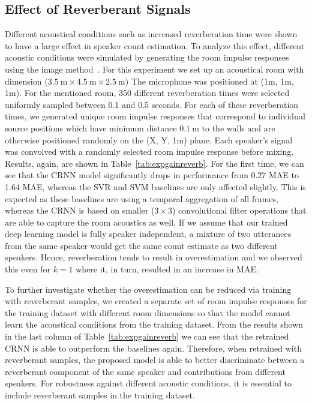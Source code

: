 \subsection{Effect of Reverberant Signals}%
\label{ssec:exp_reverb}
Different acoustical conditions such as increased reverberation time were shown~\cite{Pasha17_reverb} to have a large effect in speaker count estimation.
To analyze this effect, different acoustic conditions were simulated by generating the room impulse responses using the image method~\cite{allen79, habets16}.
For this experiment we set up an acoustical room with dimension ($3.5~\mbox{m} \times 4.5~\mbox{m} \times 2.5~\mbox{m}$)
The microphone was positioned at (1m, 1m, 1m).
For the mentioned room, 350 different reverberation times were selected uniformly sampled between 0.1 and 0.5 seconds.
For each of these reverberation times, we generated unique room impulse responses that correspond to individual source positions which have minimum distance $0.1~\mbox{m}$ to the walls and are otherwise positioned randomly on the (X, Y, 1m) plane.
Each speaker's signal was convolved with a randomly selected room impulse response before mixing.
Results, again, are shown in Table~\ref{tab:expgainreverb}.
For the first time, we can see that the CRNN model significantly drops in performance from 0.27 MAE to 1.64 MAE, whereas the SVR and SVM baselines are only affected slightly.
This is expected as these baselines are using a temporal aggregation of all frames, whereas the CRNN is based on smaller (\(3 \times 3\)) convolutional filter operations that are able to capture the room acoustics as well.
If we assume that our trained deep learning model is fully speaker independent, a mixture of two utterances from the same speaker would get the same count estimate as two different speakers.
Hence, reverberation tends to result in overestimation and we observed this even for \(k = 1\) where it, in turn, resulted in an increase in MAE.
\par
To further investigate whether the overestimation can be reduced via training with reverberant samples, we created a separate set of room impulse responses for the training dataset with different room dimensions so that the model cannot learn the acoustical conditions from the training dataset.
From the results shown in the last column of Table~\ref{tab:expgainreverb} we can see that the retrained CRNN is able to outperform the baselines again.
Therefore, when retrained with reverberant samples, the proposed model is able to better discriminate between a reverberant component of the same speaker and contributions from different speakers.
For robustness against different acoustic conditions, it is essential to include reverberant samples in the training dataset.

